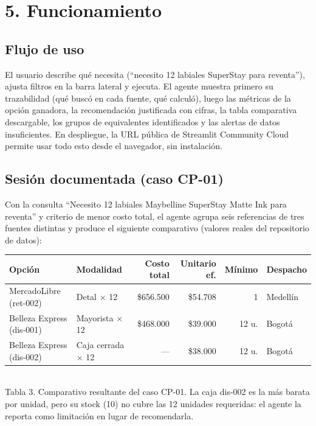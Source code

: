 \documentclass[11pt,letterpaper]{article}
\begin{document}
\section*{5. Funcionamiento}

\subsection*{Flujo de uso}

El usuario describe qué necesita (``necesito 12 labiales SuperStay para reventa''), ajusta filtros en
la barra lateral y ejecuta. El agente muestra primero su trazabilidad (qué buscó en cada fuente, qué
calculó), luego las métricas de la opción ganadora, la recomendación justificada con cifras, la tabla
comparativa descargable, los grupos de equivalentes identificados y las alertas de datos insuficientes.
En despliegue, la URL pública de Streamlit Community Cloud permite usar todo esto desde el navegador,
sin instalación.

\subsection*{Sesión documentada (caso CP-01)}

Con la consulta ``Necesito 12 labiales Maybelline SuperStay Matte Ink para reventa'' y criterio de
menor costo total, el agente agrupa seis referencias de tres fuentes distintas y produce el siguiente
comparativo (valores reales del repositorio de datos):

\begin{center}
{\small
\begin{tabular}{@{}l l r r r l@{}}
\toprule
\textbf{Opción} & \textbf{Modalidad} & \textbf{Costo total} & \textbf{Unitario ef.} & \textbf{Mínimo} & \textbf{Despacho} \\
\midrule
MercadoLibre (ret-002) & Detal $\times$ 12 & \$656.500 & \$54.708 & 1 & Medellín \\
Belleza Express (dis-001) & Mayorista $\times$ 12 & \$468.000 & \$39.000 & 12 u. & Bogotá \\
Belleza Express (dis-002) & Caja cerrada $\times$ 12 & --- & \$38.000 & 12 u. & Bogotá \\
\bottomrule
\end{tabular}}\\[4pt]
{\small Tabla 3. Comparativo resultante del caso CP-01. La caja dis-002 es la más barata por unidad,
pero su stock (10) no cubre las 12 unidades requeridas: el agente la reporta como limitación en lugar
de recomendarla.}
\end{center}
\end{document}
